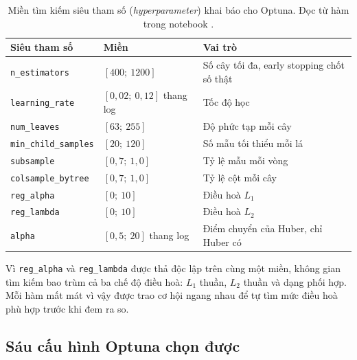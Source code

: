 \begin{table}[htbp]
\centering

\small
\begin{tabular}{l l l}
\toprule
\textbf{Siêu tham số} & \textbf{Miền} & \textbf{Vai trò} \\
\midrule
\texttt{n\_estimators}     & $[400;\ 1200]$ & Số cây tối đa, early stopping chốt số thật \\
\texttt{learning\_rate}    & $[0{,}02;\ 0{,}12]$ thang log & Tốc độ học \\
\texttt{num\_leaves}       & $[63;\ 255]$ & Độ phức tạp mỗi cây \\
\texttt{min\_child\_samples} & $[20;\ 120]$ & Số mẫu tối thiểu mỗi lá \\
\texttt{subsample}         & $[0{,}7;\ 1{,}0]$ & Tỷ lệ mẫu mỗi vòng \\
\texttt{colsample\_bytree} & $[0{,}7;\ 1{,}0]$ & Tỷ lệ cột mỗi cây \\
\texttt{reg\_alpha}        & $[0;\ 10]$ & Điều hoà $L_1$ \\
\texttt{reg\_lambda}       & $[0;\ 10]$ & Điều hoà $L_2$ \\
\texttt{alpha}             & $[0{,}5;\ 20]$ thang log & Điểm chuyển của Huber, chỉ Huber có \\
\bottomrule
\end{tabular}
\caption[Miền tìm kiếm siêu tham số (\textit{hyperparameter}) khai báo cho Optuna]{Miền tìm kiếm siêu tham số (\textit{hyperparameter}) khai báo cho Optuna. Đọc từ hàm  trong
notebook .}
\label{tab:mien_optuna}
\end{table}

Vì \texttt{reg\_alpha} và \texttt{reg\_lambda} được thả độc lập trên cùng một miền, không gian
tìm kiếm bao trùm cả ba chế độ điều hoà: $L_1$ thuần, $L_2$ thuần và dạng phối hợp. Mỗi hàm mất
mát vì vậy được trao cơ hội ngang nhau để tự tìm mức điều hoà phù hợp trước khi đem ra so.

\FloatBarrier
\subsection{Sáu cấu hình Optuna chọn được}


